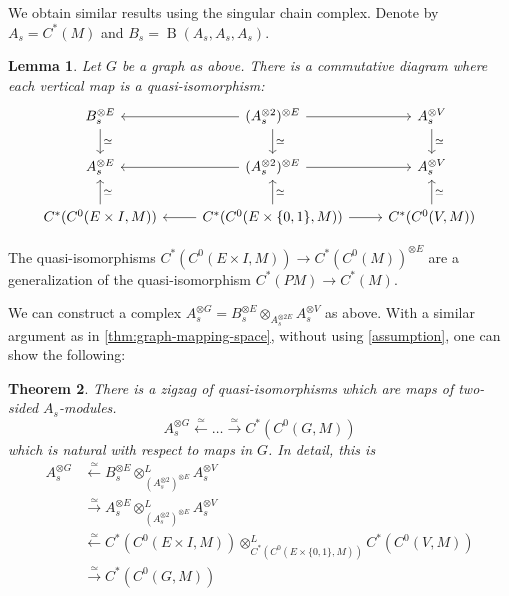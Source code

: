 \documentclass{scrartcl}
\theoremstyle{plain}
\newtheorem{theorem}{Theorem}[section]
\newtheorem{lemma}[theorem]{Lemma}
\theoremstyle{definition}
\newcommand{\quiso}{\simeq}
\newcommand{\from}{\leftarrow}
\let\xto\xrightarrow
\let\xfrom\xleftarrow
\DeclareMathOperator{\Map}{Map}
\DeclareMathOperator{\BC}{B}
\begin{document}
We obtain similar results using the singular chain complex. Denote by $A_s = C^*(M)$ and $B_s = \BC(A_s, A_s, A_s)$.
\begin{lemma}
    Let $G$ be a graph as above.
    There is a commutative diagram where each vertical map is a quasi-isomorphism:
    \[\begin{tikzcd}
        B_s^{\otimes E} \dar["\quiso"] & \dar["\quiso"] \lar  (A_s^{\otimes 2})^{\otimes E} \rar & A_s^{\otimes V} \dar["\quiso"]  \\
        A_s^{\otimes E} & \lar (A_s^{\otimes 2})^{\otimes E} \rar & A_s^{\otimes V} \\
        C^*( C^0(E\times I, M)) \uar[swap, "\quiso"] & \lar  C^*( C^0(E\times \{0, 1\}, M)) \rar \uar[swap, "\quiso"] &  C^*( C^0(V, M))\uar[swap, "\quiso"]
    \end{tikzcd}\]
\end{lemma}

The quasi-isomorphisms $C^*( C^0(E\times I, M)) \to C^*( C^0(M))^{\otimes E}$ are a generalization of the quasi-isomorphism $C^*(PM)\to C^*(M)$. 

We can construct a complex $A_s^{\otimes G} = B_s^{\otimes E} \otimes_{A_s^{\otimes 2E}} A_s^{\otimes V}$ as above. With a similar argument as in \cref{thm:graph-mapping-space}, without using \cref{assumption}, one can show the following:
\begin{theorem}\label{thm:graph-mapping-space-singular}
    There is a zigzag of quasi-isomorphisms which are maps of two-sided $A_s$-modules.
    $$A_s^{\otimes G} \xfrom{\quiso} \dots \xto{\quiso} C^*( C^0(G, M))$$
    which is natural with respect to maps in $G$. In detail, this is
        \begin{align*}
            A_s^{\otimes G} &\xfrom{\quiso} B_s^{\otimes E} \otimes^L_{(A_s^{\otimes 2})^{\otimes E}} A_s^{\otimes V} \\&\xto{\quiso} A_s^{\otimes E} \otimes^L_{(A_s^{\otimes 2})^{\otimes E}} A_s^{\otimes V}\\ &\xfrom{\quiso} C^*( C^0(E\times I, M))\otimes^L_{C^*( C^0(E\times \{0, 1\}, M))} C^*( C^0(V, M)) \\&\xto{\quiso} C^*( C^0(G, M))
        \end{align*}
\end{theorem}
\end{document}

